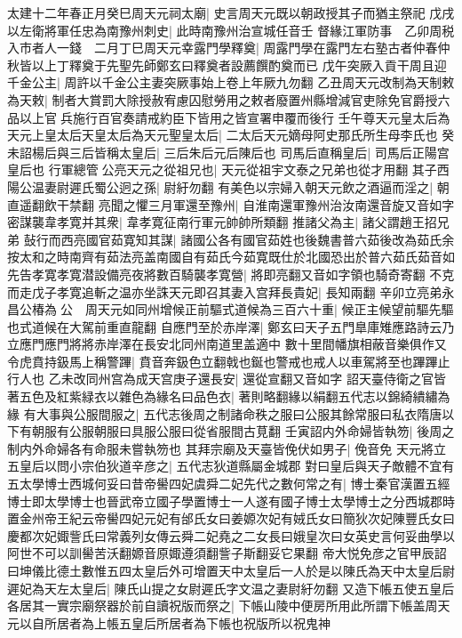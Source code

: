 太建十二年春正月癸巳周天元祠太廟|{
	史言周天元既以朝政授其子而猶主祭祀}
戊戌以左衛將軍任忠為南豫州刺史|{
	此時南豫州治宣城任音壬}
督緣江軍防事　乙卯周税入市者人一錢　二月丁巳周天元幸露門學釋奠|{
	周露門學在露門左右塾古者仲春仲秋皆以上丁釋奠于先聖先師鄭玄曰釋奠者設薦饌酌奠而已}
戊午突厥入貢干周且迎千金公主|{
	周許以千金公主妻突厥事始上卷上年厥九勿翻}
乙丑周天元改制為天制敕為天敕|{
	制者大賞罰大除授赦宥慮囚慰勞用之敕者廢置州縣增減官吏除免官爵授六品以上官兵施行百官奏請戒約臣下皆用之皆宣署申覆而後行}
壬午尊天元皇太后為天元上皇太后天皇太后為天元聖皇太后|{
	二太后天元嫡母阿史那氏所生母李氏也}
癸未詔楊后與三后皆稱太皇后|{
	三后朱后元后陳后也}
司馬后直稱皇后|{
	司馬后正陽宫皇后也}
行軍總管公亮天元之從祖兄也|{
	天元從祖宇文泰之兄弟也從才用翻}
其子西陽公温妻尉遲氏蜀公迥之孫|{
	尉紆勿翻}
有美色以宗婦入朝天元飲之酒逼而淫之|{
	朝直遥翻飲干禁翻}
亮聞之懼三月軍還至豫州|{
	自淮南還軍豫州治汝南還音旋又音如字}
密謀襲韋孝寛并其衆|{
	韋孝寛征南行軍元帥帥所類翻}
推諸父為主|{
	諸父謂趙王招兄弟}
鼔行而西亮國官茹寛知其謀|{
	諸國公各有國官茹姓也後魏書普六茹後改為茹氏余按太和之時南齊有茹法亮盖南國自有茹氏今茹寛既仕於北國恐出於普六茹氏茹音如}
先告孝寛孝寛潜設備亮夜將數百騎襲孝寛營|{
	將即亮翻又音如字領也騎奇寄翻}
不克而走戊子孝寛追斬之温亦坐誅天元即召其妻入宫拜長貴妃|{
	長知兩翻}
辛卯立亮弟永昌公椿為公　周天元如同州增候正前驅式道候為三百六十重|{
	候正主候望前驅先驅也式道候在大駕前重直龍翻}
自應門至於赤岸澤|{
	鄭玄曰天子五門臯庫雉應路詩云乃立應門應門將將赤岸澤在長安北同州南道里盖適中}
數十里間幡旗相蔽音樂俱作又令虎賁持鈒馬上稱警蹕|{
	賁音奔鈒色立翻戟也鋋也警戒也戒人以車駕將至也蹕蹕止行人也}
乙未改同州宫為成天宫庚子還長安|{
	還從宣翻又音如字}
詔天臺侍衛之官皆著五色及紅紫緑衣以雜色為緣名曰品色衣|{
	著則略翻緣以絹翻五代志以錦綺繢繡為緣}
有大事與公服間服之|{
	五代志後周之制諸命秩之服曰公服其餘常服曰私衣隋唐以下有朝服有公服朝服曰具服公服曰從省服間古莧翻}
壬寅詔内外命婦皆執笏|{
	後周之制内外命婦各有命服未嘗執笏也}
其拜宗廟及天臺皆俛伏如男子|{
	俛音免}
天元將立五皇后以問小宗伯狄道辛彦之|{
	五代志狄道縣屬金城郡}
對曰皇后與天子敵體不宜有五太學博士西城何妥曰昔帝嚳四妃虞舜二妃先代之數何常之有|{
	博士秦官漢置五經博士即太學博士也晉武帝立國子學置博士一人遂有國子博士太學博士之分西城郡時置金州帝王紀云帝嚳四妃元妃有邰氏女曰姜嫄次妃有娀氏女曰簡狄次妃陳豐氏女曰慶都次妃娵訾氏曰常義列女傳云舜二妃堯之二女長曰娥皇次曰女英史言何妥曲學以阿世不可以訓嚳苦沃翻嫄音原娵遵須翻訾子斯翻妥它果翻}
帝大悦免彦之官甲辰詔曰坤儀比德土數惟五四太皇后外可增置天中太皇后一人於是以陳氏為天中太皇后尉遲妃為天左太皇后|{
	陳氏山提之女尉遲氏字文温之妻尉紆勿翻}
又造下帳五使五皇后各居其一實宗廟祭器於前自讀祝版而祭之|{
	下帳山陵中便房所用此所謂下帳盖周天元以自所居者為上帳五皇后所居者為下帳也祝版所以祝鬼神}
